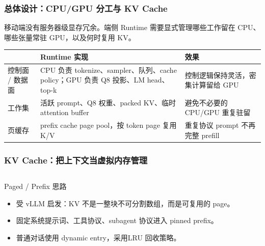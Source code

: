 \begin{frame}
  \frametitle{总体设计：CPU/GPU 分工与 KV Cache}
  \small
  移动端没有服务器级显存冗余。端侧 Runtime 需要显式管理哪些工作留在 CPU、哪些张量常驻 GPU，以及何时复用 KV。

  \vspace{0.4em}
  \scriptsize
  \begin{tabularx}{\textwidth}{p{}Y Y}
    \toprule
     & Runtime 实现 & 效果 \\
    \midrule
    控制面 / 数据面 & CPU 负责 tokenize、sampler、队列、cache policy；GPU 负责 Q8 投影、LM head、top-k & 控制逻辑保持灵活，密集计算留给 GPU \\
    工作集 & 活跃 prompt、Q8 权重、packed KV、临时 attention buffer & 避免不必要的 CPU/GPU 重复驻留 \\
    页缓存 & prefix cache page pool，按 token page 复用 K/V & 重复协议 prompt 不再完整 prefill \\
    \bottomrule
  \end{tabularx}
\end{frame}

\begin{frame}
  \frametitle{KV Cache：把上下文当虚拟内存管理}
  \begin{columns}[T,onlytextwidth]
    \begin{column}{0.48\textwidth}
      \begin{block}{Paged / Prefix 思路}
        \scriptsize
        \begin{itemize}
          \item 受 vLLM 启发：KV 不是一整块不可分割数组，而是可复用的 page。
          \item 固定系统提示词、工具协议、subagent 协议进入 pinned prefix。
          \item 普通对话使用 dynamic entry，采用LRU 回收策略。
        \end{itemize}
      \end{block}
    \end{column}
  \end{columns}

  \vspace{0.35em}
  \footnotesize
\end{frame}

